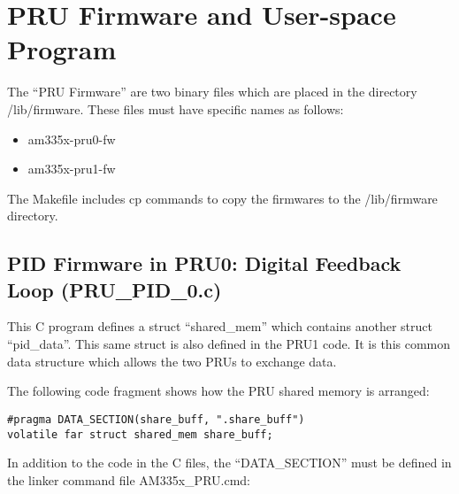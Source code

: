 %
%
%

\chapter{PRU Firmware and User-space Program}

The ``PRU Firmware'' are two binary files which are placed in the directory /lib/firmware.
These files must have specific names as follows:

\begin{itemize}
	\item am335x-pru0-fw
	\item am335x-pru1-fw
\end{itemize}

The Makefile includes cp commands to copy the firmwares to the /lib/firmware directory.

\section{PID Firmware in PRU0:  Digital Feedback Loop (PRU\_PID\_0.c)}

This C program defines a struct ``shared\_mem'' which contains another struct ``pid\_data''. This same struct is also defined in the PRU1 code.  It is this common data structure which allows the two PRUs to exchange data.

The following code fragment shows how the PRU shared memory is arranged:

\begin{verbatim}
#pragma DATA_SECTION(share_buff, ".share_buff")
volatile far struct shared_mem share_buff;
\end{verbatim}

In addition to the code in the C files, the ``DATA\_SECTION'' must be defined in the linker command file AM335x\_PRU.cmd:

